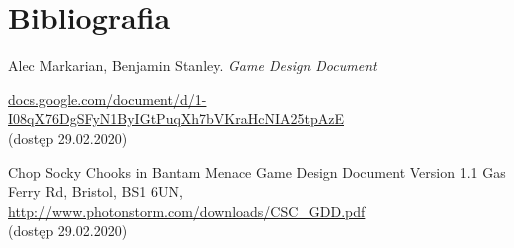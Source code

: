 \documentclass[a4paper,12pt, twoside, titlepage]{article}
\begin{document}
 
\newpage
\section{Bibliografia}

\begingroup
\renewcommand{\section}[2]{}%
\begin{thebibliography}{}
	Alec Markarian, Benjamin Stanley.
	\emph{Game Design Document}

	\href{https://docs.google.com/document/d/1-I08qX76DgSFyN1ByIGtPuqXh7bVKraHcNIA25tpAzE}{docs.google.com/document/d/1-I08qX76DgSFyN1ByIGtPuqXh7bVKraHcNIA25tpAzE}\\
	(dostęp 29.02.2020)

	Chop Socky Chooks in Bantam Menace Game Design Document Version 1.1 Gas Ferry Rd, Bristol, BS1 6UN, \url{http://www.photonstorm.com/downloads/CSC_GDD.pdf}\\
	(dostęp 29.02.2020)

\end{thebibliography}
\endgroup
\end{document}
